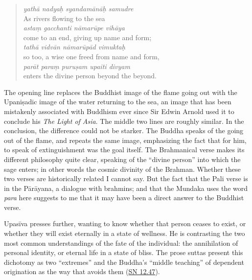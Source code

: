 \documentclass[12pt,openany]{book}%
\begin{document}
\begin{verse}%
\textit{\textsanskrit{yathā} nadyaḥ \textsanskrit{syandamānāḥ} samudre} \\
As rivers flowing to the sea \\
\textit{astaṃ gacchanti \textsanskrit{nāmarūpe} \textsanskrit{vihāya}} \\
come to an end, giving up name and form; \\
\textit{\textsanskrit{tathā} \textsanskrit{vidvān} \textsanskrit{nāmarūpād} vimuktaḥ} \\
so too, a wise one freed from name and form, \\
\textit{\textsanskrit{parāt} paraṃ \textsanskrit{puruṣam} upaiti divyam} \\
enters the divine person beyond the beyond.

%
\end{verse}

The opening line replaces the Buddhist image of the flame going out with the \textsanskrit{Upaniṣadic} image of the water returning to the sea, an image that has been mistakenly associated with Buddhism ever since Sir Edwin Arnold used it to conclude his \textit{The Light of Asia}. The middle two lines are roughly similar. In the conclusion, the difference could not be starker. The Buddha speaks of the going out of the flame, and repeats the same image, emphasizing the fact that for him, to speak of extinguishment was the goal itself. The Brahmanical verse makes its different philosophy quite clear, speaking of the “divine person” into which the sage enters; in other words the cosmic divinity of the Brahman. Whether these two verses are historically related I cannot say. But the fact that the Pali verse is in the \textsanskrit{Pārāyana}, a dialogue with brahmins; and that the Mundaka uses the word \textit{para} here suggests to me that it may have been a direct answer to the Buddhist verse.

\textsanskrit{Upasīva} presses further, wanting to know whether that person ceases to exist, or whether they will exist eternally in a state of wellness. He is contrasting the two most common understandings of the fate of the individual: the annihilation of personal identity, or eternal life in a state of bliss. The prose suttas present this dichotomy as two “extremes” and the Buddha’s “middle teaching” of dependent origination as the way that avoids them (\href{https://suttacentral.net/sn12.47/en/sujato}{SN 12.47}).
\end{document}
